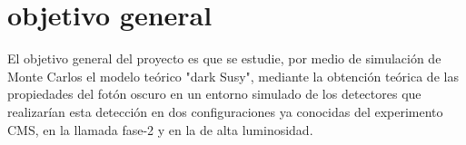 

\chapter{objetivo general}

El objetivo general del proyecto es que se estudie, por medio de simulación de Monte Carlos el modelo teórico "dark Susy", mediante la obtención teórica de las propiedades del fotón oscuro en un entorno simulado de los detectores que realizarían esta detección en dos configuraciones ya conocidas del experimento CMS, en la llamada fase-2 y en la de alta luminosidad.



